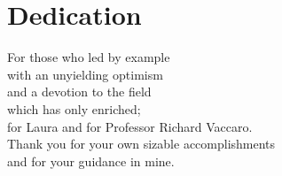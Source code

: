 \documentclass[crop=false,float=true,class=scrreprt]{standalone}
\begin{document}
\chapter*{Dedication}

\hspace{+3em}%
\begin{minipage}[c][0.5\textheight][c]{0.75\textwidth}

For those who led by example   \\ \hspace*{+0.65em}%
with an unyielding optimism    \\ \hspace*{+1.55em}%
and a devotion to the field    \\ \hspace*{+2.7em}%
which has only enriched;       \\

for Laura and for Professor Richard Vaccaro.\\[+0.5em]

Thank you for your own sizable accomplishments\\
\hspace*{+1em}and for your guidance in mine.

\vspace{+0.05\textheight}

\end{minipage}
\end{document}
